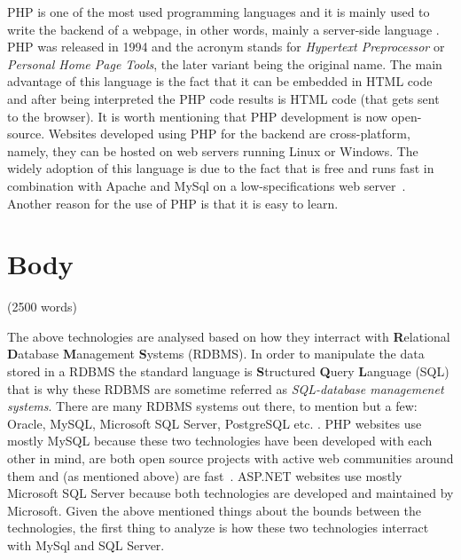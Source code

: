 \documentclass[11]{article}
\begin{document}
	PHP is one of the most used programming languages \citep{cass2014top, cass20152015} and it is mainly used to write the backend of a webpage, in other words, mainly a server-side language . PHP was released in 1994 and the acronym stands for \textit{Hypertext Preprocessor}  or \textit{Personal Home Page Tools}, the later variant being the original name. The main advantage of this language is the fact that it can be embedded in HTML code and after being interpreted the PHP code results is HTML code (that gets sent to the browser). It is worth mentioning that PHP development is now open-source. Websites developed using PHP for the backend are cross-platform, namely, they can be hosted on web servers running Linux or Windows. The widely adoption of this language is due to the fact that is free and runs fast in combination with Apache and MySql on a low-specifications web server~\citep{converse2004php5}. Another reason for the use of PHP is that it is easy to learn.

\section*{Body}(2500 words)

	The above technologies are analysed based on how they interract with \textbf{R}elational \textbf{D}atabase \textbf{M}anagement \textbf{S}ystems (RDBMS). In order to manipulate the data stored in a RDBMS the standard language is \textbf{S}tructured \textbf{Q}uery \textbf{L}anguage (SQL) that is why these RDBMS are sometime referred as \textit{SQL-database managemenet systems}. There are many RDBMS systems out there, to mention but a few: Oracle, MySQL, Microsoft SQL Server, PostgreSQL etc. . PHP websites use mostly MySQL because these two technologies have been developed with each other in mind, are both open source projects with active web communities around them and (as mentioned above) are fast~\citep{davis2007learning}. ASP.NET websites use mostly Microsoft SQL Server because both technologies are developed and maintained by Microsoft. Given the above mentioned things about the bounds between the technologies, the first thing to analyze is how  these two technologies interract with MySql and SQL Server.\\ 
\end{document}
